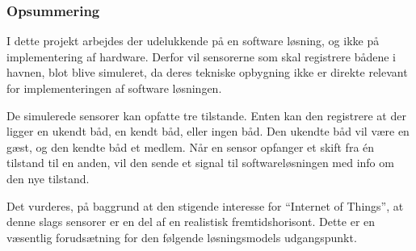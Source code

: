 \subsubsection{Opsummering}

I dette projekt arbejdes der udelukkende på en software løsning, og ikke på implementering af hardware. Derfor vil sensorerne som skal registrere bådene i havnen, blot blive simuleret, da deres tekniske opbygning ikke er direkte relevant for implementeringen af software løsningen. 

De simulerede sensorer kan opfatte tre tilstande. Enten kan den registrere at der ligger en ukendt båd, en kendt båd, eller ingen båd. Den ukendte båd vil være en gæst, og den kendte båd et medlem. Når en sensor opfanger et skift fra én tilstand til en anden, vil den sende et signal til softwareløsningen med info om den nye tilstand.

Det vurderes, på baggrund at den stigende interesse for \enquote{Internet of Things}, at denne slags sensorer er en del af en realistisk fremtidshorisont. Dette er en væsentlig forudsætning for den følgende løsningsmodels udgangspunkt.